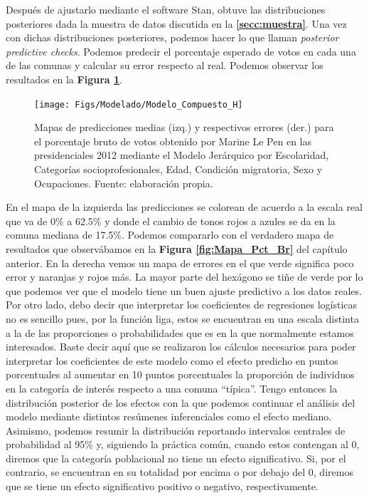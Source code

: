 Después de ajustarlo mediante el software Stan, obtuve las distribuciones posteriores dada la muestra de datos discutida en la \textbf{\autoref{secc:muestra}}. Una vez con dichas distribuciones posteriores, podemos hacer lo que \textcite{Gelman13} llaman \textit{posterior predictive checks}. Podemos predecir el porcentaje esperado de votos en cada una de las comunas y calcular su error respecto al real. Podemos observar los resultados en la \textbf{Figura \ref{fig:Modelo_Compuesto_H}}.\\

\begin{figure}
	\centering
	\texttt{[image: Figs/Modelado/Modelo\_Compuesto\_H]}
	\caption{Mapas de predicciones medias (izq.) y respectivos errores (der.) para el porcentaje bruto de votos obtenido por Marine Le Pen en las presidenciales 2012 mediante el Modelo Jerárquico por Escolaridad, Categorías socioprofesionales, Edad, Condición migratoria, Sexo y Ocupaciones. Fuente: elaboración propia.}
	\label{fig:Modelo_Compuesto_H}
\end{figure}

En el mapa de la izquierda las predicciones se colorean de acuerdo a la escala real que va de 0\% a 62.5\% y donde el cambio de tonos rojos a azules se da en la comuna mediana de 17.5\%. Podemos compararlo con el verdadero mapa de resultados que observábamos en la \textbf{Figura \ref{fig:Mapa_Pct_Br}} del capítulo anterior. En la derecha vemos un mapa de errores en el que verde significa poco error y naranjas y rojos más. La mayor parte del hexágono se tiñe de verde por lo que podemos ver que el modelo tiene un buen ajuste predictivo a los datos reales.\\

Por otro lado, debo decir que interpretar los coeficientes de regresiones logísticas no es sencillo pues, por la función liga, estos se encuentran en una escala distinta a la de las proporciones o probabilidades que es en la que normalmente estamos interesados. Baste decir aquí que se realizaron los cálculos necesarios para poder interpretar los coeficientes de este modelo como el efecto predicho en puntos porcentuales al aumentar en 10 puntos porcentuales la proporción de individuos en la categoría de interés respecto a una comuna ``típica''. Tengo entonces la distribución posterior de los efectos con la que podemos continuar el análisis del modelo mediante distintos resúmenes inferenciales como el efecto mediano. Asimismo, podemos resumir la distribución reportando intervalos centrales de probabilidad al 95\% y, siguiendo la práctica común, cuando estos contengan al 0, diremos que la categoría poblacional no tiene un efecto significativo. Si, por el contrario, se encuentran en su totalidad por encima o por debajo del 0, diremos que se tiene un efecto significativo positivo o negativo, respectivamente.

